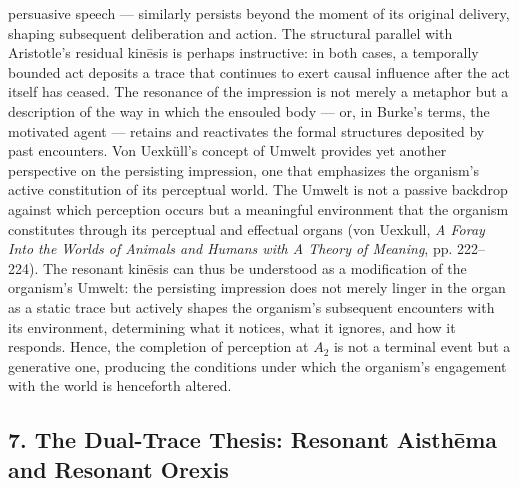persuasive speech --- similarly persists beyond the moment of its original delivery, shaping subsequent deliberation and action. The structural parallel with Aristotle's residual kinēsis is perhaps instructive: in both cases, a temporally bounded act deposits a trace that continues to exert causal influence after the act itself has ceased. The resonance of the impression is not merely a metaphor but a description of the way in which the ensouled body --- or, in Burke's terms, the motivated agent --- retains and reactivates the formal structures deposited by past encounters. Von Uexküll's concept of Umwelt provides yet another perspective on the persisting impression, one that emphasizes the organism's active constitution of its perceptual world. The Umwelt is not a passive backdrop against which perception occurs but a meaningful environment that the organism constitutes through its perceptual and effectual organs (von Uexkull, \textit{A Foray Into the Worlds of Animals and Humans with A Theory of Meaning}, pp. 222--224). The resonant kinēsis can thus be understood as a modification of the organism's Umwelt: the persisting impression does not merely linger in the organ as a static trace but actively shapes the organism's subsequent encounters with its environment, determining what it notices, what it ignores, and how it responds. Hence, the completion of perception at $A_2$ is not a terminal event but a generative one, producing the conditions under which the organism's engagement with the world is henceforth altered. 

\subsection*{7. The Dual-Trace Thesis: Resonant Aisthēma and Resonant Orexis}

